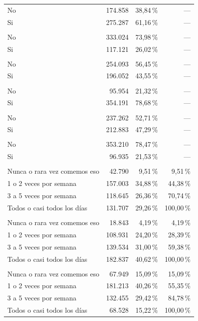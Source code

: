 \begin{longtable}{P{6.2cm} r r r}
  No & 174.858 & 38,84\,\% & --- \\
  Si & 275.287 & 61,16\,\% & --- \\
  \addlinespace
   \\
  No & 333.024 & 73,98\,\% & --- \\
  Si & 117.121 & 26,02\,\% & --- \\
  \addlinespace
   \\
  No & 254.093 & 56,45\,\% & --- \\
  Si & 196.052 & 43,55\,\% & --- \\
  \addlinespace
   \\
  No & 95.954 & 21,32\,\% & --- \\
  Si & 354.191 & 78,68\,\% & --- \\
  \addlinespace
   \\
  No & 237.262 & 52,71\,\% & --- \\
  Si & 212.883 & 47,29\,\% & --- \\
  \addlinespace
   \\
  No & 353.210 & 78,47\,\% & --- \\
  Si & 96.935 & 21,53\,\% & --- \\
  \addlinespace
   \\
  Nunca o rara vez comemos eso & 42.790 & 9,51\,\% & 9,51\,\% \\
  1 o 2 veces por semana & 157.003 & 34,88\,\% & 44,38\,\% \\
  3 a 5 veces por semana & 118.645 & 26,36\,\% & 70,74\,\% \\
  Todos o casi todos los días & 131.707 & 29,26\,\% & 100,00\,\% \\
  \addlinespace
   \\
  Nunca o rara vez comemos eso & 18.843 & 4,19\,\% & 4,19\,\% \\
  1 o 2 veces por semana & 108.931 & 24,20\,\% & 28,39\,\% \\
  3 a 5 veces por semana & 139.534 & 31,00\,\% & 59,38\,\% \\
  Todos o casi todos los días & 182.837 & 40,62\,\% & 100,00\,\% \\
  \addlinespace
   \\
  Nunca o rara vez comemos eso & 67.949 & 15,09\,\% & 15,09\,\% \\
  1 o 2 veces por semana & 181.213 & 40,26\,\% & 55,35\,\% \\
  3 a 5 veces por semana & 132.455 & 29,42\,\% & 84,78\,\% \\
  Todos o casi todos los días & 68.528 & 15,22\,\% & 100,00\,\% \\
\end{longtable}
\endgroup
\vspace{-0.8em}
